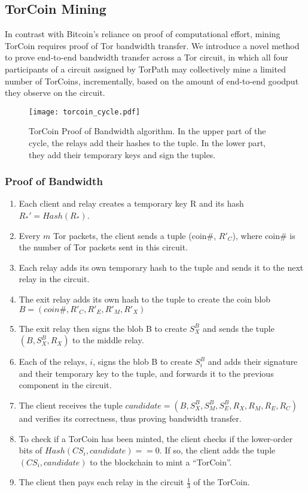 \subsection{TorCoin Mining}

In contrast with Bitcoin's reliance on proof of computational effort,
mining TorCoin requires proof of Tor bandwidth transfer.
We introduce a novel method to
prove end-to-end bandwidth transfer across a Tor circuit,
in which all four participants of a circuit assigned by TorPath
may collectively mine a limited number of TorCoins, incrementally,
based on the amount of end-to-end goodput they observe on the circuit.

\begin{figure}[H]
  \centering
    \texttt{[image: torcoin\_cycle.pdf]}
  \caption{TorCoin Proof of Bandwidth algorithm. In the upper part of the cycle, the relays add their hashes to the tuple. In the lower part, they add their temporary keys and sign the tuples.}
\end{figure}

\subsubsection{Proof of Bandwidth}
\begin{enumerate}
\item Each client and relay creates a temporary key R and its hash $R_*' = Hash(R_*)$. 
\item Every $m$ Tor packets, the client sends a tuple (coin\#, $R'_C$), where coin\# is the number of Tor packets sent in this circuit.
\item Each relay adds its own temporary hash to the tuple and sends it to the next relay in the circuit.
\item The exit relay adds its own hash to the tuple to create the coin blob 
$B = (coin\#, R'_{C}, R'_{E}, R'_{M}, R'_{X})$ 
\item The exit relay then signs the blob B to create $S^B_X$ and sends the tuple $(B, S^B_X, R_X)$ to the middle relay.
\item Each of the relays, $i$, signs the blob B to create $S^B_i$ and adds their signature and their temporary key to the tuple, and forwards it to the previous component in the circuit. 
\item The client receives the tuple $candidate = (B, S^B_X, S^B_M, S^B_E, R_X, R_M, R_E, R_C)$ and verifies its correctness, thus proving bandwidth transfer.
\item To check if a TorCoin has been minted, the client checks if the lower-order bits of $Hash(CS_i, candidate) == 0$. If so, the client adds the tuple $(CS_i, candidate)$ to the blockchain to mint a ``TorCoin''.
\item The client then pays each relay in the circuit $\frac{1}{3}$ of the TorCoin. 
\end{enumerate}

